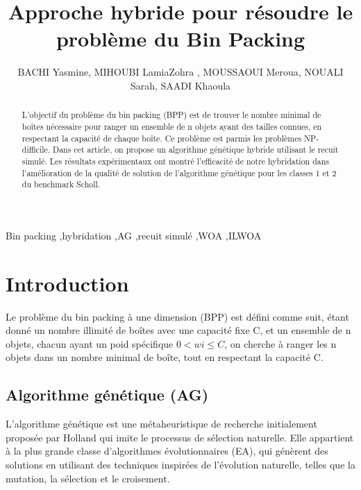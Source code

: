 \documentclass[preprint]{elsarticle}
\begin{document}
\pagestyle{fancy}
\begin{frontmatter}


\title{Approche hybride pour résoudre le problème du Bin Packing}
\author{BACHI Yasmine, MIHOUBI LamiaZohra , MOUSSAOUI Meroua, NOUALI Sarah, SAADI Khaoula}
\address{Ecole nationale Supérieure d'Informatique -ESI-Alger}
\begin{abstract}
L’objectif du problème du bin packing (BPP) est de trouver le nombre minimal de boîtes nécessaire pour ranger un ensemble de n objets ayant des tailles connues, en respectant la capacité de chaque boîte. Ce problème est parmis les problèmes NP-difficile. Dans cet article, on propose un algorithme génétique  hybride utilisant le recuit simulé. Les résultats expérimentaux   ont montré l’efficacité de notre hybridation dans l’amélioration de la qualité de solution de l’algorithme génétique pour les classes 1 et 2 du benchmark Scholl. \end{abstract}

\begin{keyword}
Bin packing \sep hybridation \sep AG \sep recuit simulé \sep WOA \sep ILWOA 
\end{keyword}

\end{frontmatter}


\section{Introduction}
\label{S:1}

Le problème du bin packing à une dimension (BPP) est défini comme suit, étant donné un nombre illimité de boîtes avec une capacité fixe C, et un ensemble de n objets, chacun ayant un poid spécifique $0<wi\leqslant C$, on cherche à ranger les n objets dans un nombre minimal de boîte, tout en respectant la capacité C. 


\subsection{Algorithme génétique (AG)}
L’algorithme génétique est une métaheuristique de recherche initialement proposée par Holland \cite{Holland} qui imite le processus de sélection naturelle. Elle appartient à la plus grande classe d'algorithmes évolutionnaires (EA), qui génèrent des solutions en utilisant des techniques inspirées de l'évolution naturelle, telles que la mutation, la sélection et le croisement.
\end{document}
